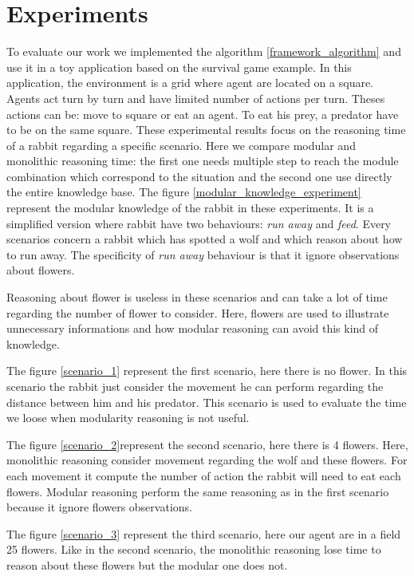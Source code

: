 \documentclass{aamas2012}
\begin{document}
\section{Experiments}

	To evaluate our work we implemented the algorithm \ref{framework_algorithm} and use it in a toy application based on the survival game example.
	In this application, the environment is a grid where agent are located on a square.
	Agents act turn by turn and have limited number of actions per turn.
	Theses actions can be: move to square or eat an agent.
	To eat his prey, a predator have to be on the same square.
	These experimental results focus on the reasoning time of a rabbit regarding a specific scenario.
	Here we compare modular and monolithic reasoning time: the first one needs multiple step to reach the module combination
	which correspond to the situation and the second one use directly the entire knowledge base.
	The figure \ref{modular_knowledge_experiment} represent the modular knowledge of the rabbit in these experiments.
	It is a simplified version where rabbit have two behaviours: \textit{run away} and \textit{feed}.
	Every scenarios concern a rabbit which has spotted a wolf and which reason about how to run away.
	The specificity of \textit{run away} behaviour is that it ignore observations about flowers. 
	
	Reasoning about flower is useless in these scenarios and can take a lot of time regarding the number of flower to consider.
	Here, flowers are used to illustrate unnecessary informations and how modular reasoning can avoid this kind of knowledge.
	
	The figure \ref{scenario_1} represent the first scenario, here there is no flower.
	In this scenario the rabbit just consider the movement he can perform regarding the distance between him and his predator.
	This scenario is used to evaluate the time we loose when modularity reasoning is not useful.
	
	The figure \ref{scenario_2}represent the second scenario, here there is 4 flowers.
	Here, monolithic reasoning consider movement regarding the wolf and these flowers.
	For each movement it compute the number of action the rabbit will need to eat each flowers.
	Modular reasoning perform the same reasoning as in the first scenario because it ignore flowers observations.
	
	The figure \ref{scenario_3} represent the third scenario, here our agent are in a field 25 flowers.
	Like in the second scenario, the monolithic reasoning lose time to reason about these flowers but the modular one does not.
	
\end{document}
